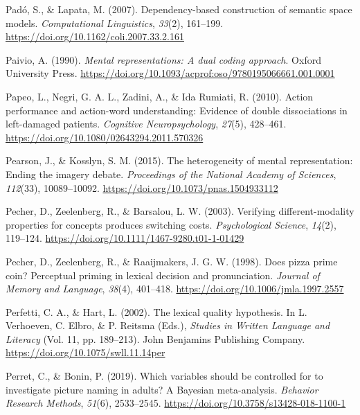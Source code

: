\documentclass[
  12pt,
  man,floatsintext]{apa7}
\newlength{\cslhangindent}
\newlength{\cslentryspacingunit} %
\newenvironment{CSLReferences}[2] %
 {%
  \setlength{\parindent}{0pt}
  \ifodd #1
  \let\oldpar\par
  \def\par{\hangindent=\cslhangindent\oldpar}
  \fi
  \setlength{\parskip}{#2\cslentryspacingunit}
 }%
 {}
\begin{document}
\begin{CSLReferences}{1}{0}
\leavevmode{}%
Padó, S., \& Lapata, M. (2007). Dependency-based construction of semantic space models. \emph{Computational Linguistics}, \emph{33}(2), 161--199. \url{https://doi.org/10.1162/coli.2007.33.2.161}

\leavevmode{}%
Paivio, A. (1990). \emph{Mental representations: A dual coding approach}. {Oxford University Press}. \url{https://doi.org/10.1093/acprof:oso/9780195066661.001.0001}

\leavevmode{}%
Papeo, L., Negri, G. A. L., Zadini, A., \& Ida Rumiati, R. (2010). Action performance and action-word understanding: {Evidence} of double dissociations in left-damaged patients. \emph{Cognitive Neuropsychology}, \emph{27}(5), 428--461. \url{https://doi.org/10.1080/02643294.2011.570326}

\leavevmode{}%
Pearson, J., \& Kosslyn, S. M. (2015). The heterogeneity of mental representation: {Ending} the imagery debate. \emph{Proceedings of the National Academy of Sciences}, \emph{112}(33), 10089--10092. \url{https://doi.org/10.1073/pnas.1504933112}

\leavevmode{}%
Pecher, D., Zeelenberg, R., \& Barsalou, L. W. (2003). Verifying different-modality properties for concepts produces switching costs. \emph{Psychological Science}, \emph{14}(2), 119--124. \url{https://doi.org/10.1111/1467-9280.t01-1-01429}

\leavevmode{}%
Pecher, D., Zeelenberg, R., \& Raaijmakers, J. G. W. (1998). Does pizza prime coin? {Perceptual} priming in lexical decision and pronunciation. \emph{Journal of Memory and Language}, \emph{38}(4), 401--418. \url{https://doi.org/10.1006/jmla.1997.2557}

\leavevmode{}%
Perfetti, C. A., \& Hart, L. (2002). The lexical quality hypothesis. In L. Verhoeven, C. Elbro, \& P. Reitsma (Eds.), \emph{Studies in {Written Language} and {Literacy}} (Vol. 11, pp. 189--213). {John Benjamins Publishing Company}. \url{https://doi.org/10.1075/swll.11.14per}

\leavevmode{}%
Perret, C., \& Bonin, P. (2019). Which variables should be controlled for to investigate picture naming in adults? {A Bayesian} meta-analysis. \emph{Behavior Research Methods}, \emph{51}(6), 2533--2545. \url{https://doi.org/10.3758/s13428-018-1100-1}


\end{CSLReferences}
\end{document}
